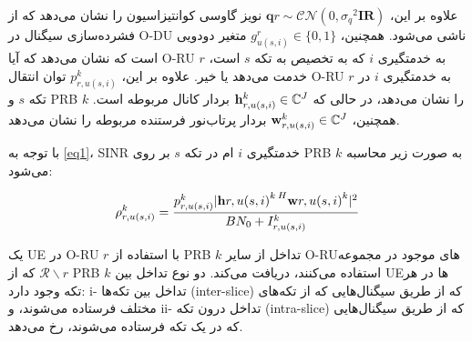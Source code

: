    علاوه بر این، $\boldsymbol{q}{r} \sim \mathcal{CN}(0,{\sigma_q}^2\boldsymbol{I{R}} )$ نویز گاوسی کوانتیزاسیون را نشان می‌دهد که از فشرده‌سازی سیگنال در O-DU ناشی می‌شود. همچنین، $g_{u(s,i)}^r \in \{0,1\}$ متغیر دودویی است که نشان می‌دهد که آیا O-RU $r$ به خدمتگیری $i$ که به تخصیص به تکه $s$ است، خدمت می‌دهد یا خیر. علاوه بر این، $p_{r,u(s,i)}^{k}$ توان انتقال O-RU $r$ به خدمتگیری $i$ در تکه $s$ و PRB $k$ را نشان می‌دهد، در حالی که ${\bold{h}_{r,u(s,i)}^{k}} \in \mathbb{  	C}^{J}$ بردار کانال مربوطه است. همچنین، $\bold{w}_{r,u(s,i)}^{k} \in \mathbb{C}^{J}$ بردار پرتاب‌نور فرستنده مربوطه را نشان می‌دهد.
   
   با توجه به \eqref{eq1}، SINR خدمتگیری $i$ ام در تکه $s$ بر روی PRB $k$ به صورت زیر محاسبه می‌شود:
   
   \begin{equation}\label{eq1}
   	\rho_{r,u(s,i)}^{k} = \frac{p_{r,u(s,i)}^{k}|{\bold{h}{r,u(s,i)}^{k \: H}} \bold{w}{r,u(s,i)}^{k}|^2}{BN_0 + I_{r,u(s,i)}^{k}}
   \end{equation}
   
   یک UE در O-RU $r$ با استفاده از PRB $k$ تداخل از سایر O-RUهای موجود در مجموعه $\mathcal{R}\backslash r$ که از PRB $k$ استفاده می‌کنند، دریافت می‌کند. دو نوع تداخل بین UEها در هر تکه وجود دارد: i- تداخل بین تکه‌ها (inter-slice) که از طریق سیگنال‌هایی که از تکه‌های مختلف فرستاده می‌شوند، و ii- تداخل درون تکه (intra-slice) که از طریق سیگنال‌هایی که در یک تکه فرستاده می‌شوند، رخ می‌دهد.
   
